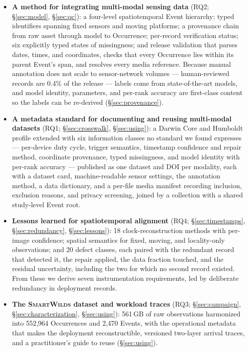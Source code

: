 \documentclass[sigconf]{acmart}
\newcommand{\smartwilds}{\textsc{SmartWilds}\xspace}
\begin{document}
\begin{itemize}
    \item \textbf{A method for integrating multi-modal sensing data}
    (RQ2; \S\ref{sec:model}, \S\ref{sec:qc}): a four-level
    spatiotemporal Event hierarchy; typed identifiers spanning fixed
    sensors and moving platforms; a provenance chain from raw asset
    through model to Occurrence; per-record verification status; six
    explicitly typed states of missingness; and release validation that
    parses dates, times, and coordinates, checks that every Occurrence
    lies within its parent Event's span, and resolves every media
    reference. Because manual annotation does not scale to
    sensor-network volumes --- human-reviewed records are 0.4\% of the
    release --- labels come from state-of-the-art models, and model
    identity, parameters, and per-rank accuracy are first-class content
    so the labels can be re-derived (\S\ref{sec:provenance}).

    \item \textbf{A metadata standard for documenting and reusing
    multi-modal datasets} (RQ1; \S\ref{sec:crosswalk},
    \S\ref{sec:using}): a Darwin Core and Humboldt profile extended
    with six information classes no standard we found expresses ---
    per-device duty cycle, trigger semantics, timestamp confidence and
    repair method, coordinate provenance, typed missingness, and model
    identity with per-rank accuracy --- published as one dataset and DOI
    per modality, each with a dataset card, machine-readable sensor
    settings, the annotation method, a data dictionary, and a per-file
    media manifest recording inclusion, exclusion reasons, and privacy
    screening, joined by a collection with a shared study-level Event
    root.

    \item \textbf{Lessons learned for spatiotemporal alignment}
    (RQ4; \S\ref{sec:timestamps}, \S\ref{sec:redundancy},
    \S\ref{sec:lessons}): 18 clock-reconstruction methods with
    per-image confidence; spatial semantics for fixed, moving, and
    locality-only observations; and 20 defect classes, each paired with
    the redundant record that detected it, the repair applied, the data
    fraction touched, and the residual uncertainty, including the two
    for which no second record existed. From these we derive seven
    instrumentation requirements, led by deliberate redundancy in
    deployment records.

    \item \textbf{The \smartwilds dataset and workload traces}
    (RQ3; \S\ref{sec:campaign}, \S\ref{sec:characterization},
    \S\ref{sec:using}): 561\,GB of raw observations harmonized into
    552{,}964 Occurrences and 2{,}470 Events, with the operational
    metadata that makes the deployment reconstructible, versioned
    two-layer arrival traces, and a practitioner's guide to reuse
    (\S\ref{sec:using}).
\end{itemize}
\end{document}
